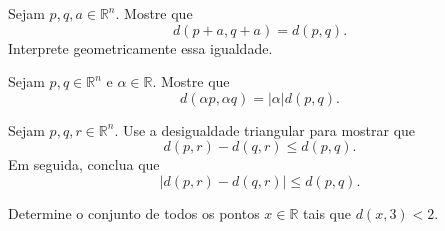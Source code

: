 \begin{exercise}
    Sejam $p,q,a\in\mathbb R^n$.
    Mostre que
    \[
        d(p+a,q+a)=d(p,q).
    \]
    Interprete geometricamente essa igualdade.
\end{exercise}

\begin{exercise}
    Sejam $p,q\in\mathbb R^n$ e $\alpha\in\mathbb R$.
    Mostre que
    \[
        d(\alpha p,\alpha q)=|\alpha|d(p,q).
    \]
\end{exercise}

\begin{exercise}
    Sejam $p,q,r\in\mathbb R^n$.
    Use a desigualdade triangular para mostrar que
    \[
        d(p,r)-d(q,r)\leq d(p,q).
    \]
    Em seguida, conclua que
    \[
        |d(p,r)-d(q,r)|\leq d(p,q).
    \]
\end{exercise}

\begin{exercise}
    Determine o conjunto de todos os pontos $x\in\mathbb R$ tais que $d(x,3)<2$.
\end{exercise}
